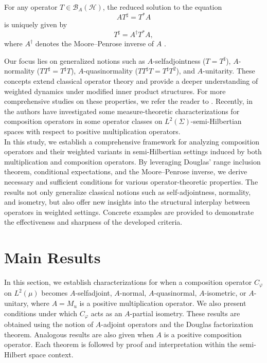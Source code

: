 \documentclass{amsart}
\theoremstyle{definition}\newtheorem{defn}[thm]{Definition}
\theoremstyle{remark}
\numberwithin{equation}{section}
\begin{document}
For any operator \( T \in \mathcal{B}_A(\mathcal{H}) \), the reduced solution to the equation
\[
A T^\sharp = T^* A
\]
is uniquely given by
\[
T^\sharp = A^\dagger T^* A,
\]
where \( A^\dagger \) denotes the Moore--Penrose inverse of \( A \) \cite{Douglas1966, Corach2008a}.

Our focus lies on generalized notions such as \( A \)-selfadjointness (\( T = T^\sharp \)), \( A \)-normality (\( T T^\sharp = T^\sharp T \)), \( A \)-quasinormality (\( T T^\sharp T = T^\sharp T^2 \)), and \( A \)-unitarity. These concepts extend classical operator theory and provide a deeper understanding of weighted dynamics under modified inner product structures. For more comprehensive studies on these properties, we refer the reader to \cite{AlMohammady2021,Arias2008, Benali2019,GuptaBhatia2015,HuangEstaremi2024,jab}. Recently, in \cite{ej} the authors have investigated some measure-theoretic characterizations for composition operators in some operator classes on $L^2(\Sigma )$-semi-Hilbertian spaces with respect to positive multiplication operators.\\

In this study, we establish a comprehensive framework for analyzing composition operators and their weighted variants in semi-Hilbertian settings induced by both multiplication and composition operators. By leveraging Douglas' range inclusion theorem, conditional expectations, and the Moore–Penrose inverse, we derive necessary and sufficient conditions for various operator-theoretic properties. The results not only generalize classical notions such as self-adjointness, normality, and isometry, but also offer new insights into the structural interplay between operators in weighted settings. Concrete examples are provided to demonstrate the effectiveness and sharpness of the developed criteria.













\section{Main Results}

In this section, we establish characterizations for when a composition operator \( C_{\varphi} \) on \( L^2(\mu) \) becomes \( A \)-selfadjoint, \( A \)-normal, \( A \)-quasinormal, \( A \)-isometric, or \( A \)-unitary, where \( A = M_u \) is a positive multiplication operator. We also present conditions under which \( C_{\varphi} \) acts as an \( A \)-partial isometry. These results are obtained using the notion of \( A \)-adjoint operators and the Douglas factorization theorem. Analogous results are also given when \( A \) is a positive composition operator. Each theorem is followed by proof and interpretation within the semi-Hilbert space context.
\end{document}

